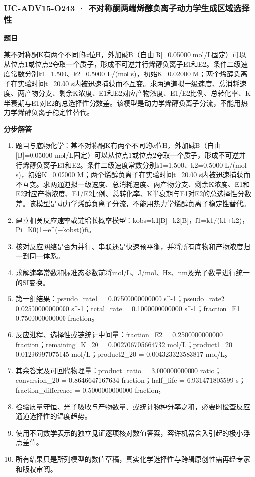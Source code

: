 \documentclass[UTF8,11pt,a4paper]{ctexart}
\begin{document}
\subsubsection*{UC-ADV15-O243 · 不对称酮两端烯醇负离子动力学生成区域选择性}
\noindent\textbf{题目}\par
某不对称酮K有两个不同的α位H，外加碱B（自由[B]=0.05000 mol/L固定）可以从位点1或位点2夺取一个质子，形成不可逆并行烯醇负离子E1和E2。条件二级速度常数分别k1=1.500、k2=0.5000 L/(mol s)，初始K=0.02000 M；两个烯醇负离子在实验时间t=20.00 s内被迅速捕获而不互变。求两通道拟一级速度、总消耗速度、两产物分支、剩余K浓度、E1和E2对应产物浓度、E1/E2比例、总转化率、K半衰期与E1对E2的总选择性分数差。该模型是动力学烯醇负离子分流，不能用热力学烯醇负离子稳定性替代。\par
\medskip\noindent\textbf{分步解答}
\begin{enumerate}
\item 题目与底物化学：某不对称酮K有两个不同的α位H，外加碱B（自由[B]=0.05000 mol/L固定）可以从位点1或位点2夺取一个质子，形成不可逆并行烯醇负离子E1和E2。条件二级速度常数分别k1=1.500、k2=0.5000 L/(mol s)，初始K=0.02000 M；两个烯醇负离子在实验时间t=20.00 s内被迅速捕获而不互变。求两通道拟一级速度、总消耗速度、两产物分支、剩余K浓度、E1和E2对应产物浓度、E1/E2比例、总转化率、K半衰期与E1对E2的总选择性分数差。该模型是动力学烯醇负离子分流，不能用热力学烯醇负离子稳定性替代。
\item 建立相关反应速率或链增长概率模型：kobs=k1[B]+k2[B]，f1=k1/(k1+k2)，Pi=K0(1−e\textasciicircum{}(−kobst))fi。
\item 核对反应网络是否为并行、串联还是快速预平衡，并将所有底物和产物浓度归一到同一体系。
\item 求解速率常数和标准态参数前将mol/L、J/mol、Hz、nm及光子数量进行统一的SI变换。
\item 第一组结果：pseudo\_rate1 = 0.07500000000000 s\textasciicircum{}-1；pseudo\_rate2 = 0.02500000000000 s\textasciicircum{}-1；total\_rate = 0.1000000000000 s\textasciicircum{}-1；fraction\_E1 = 0.7500000000000 fraction。
\item 反应进程、选择性或链统计中间量：fraction\_E2 = 0.2500000000000 fraction；remaining\_K\_20 = 0.002706705664732 mol/L；product1\_20 = 0.01296997075145 mol/L；product2\_20 = 0.004323323583817 mol/L。
\item 其余答案及可回代物理量：product\_ratio = 3.000000000000 ratio；conversion\_20 = 0.8646647167634 fraction；half\_life = 6.931471805599 s；fraction\_difference = 0.5000000000000 fraction。
\item 检验质量守恒、光子吸收与产物数量、或统计物种分率之和，必要时检查反应通道选择性的温度趋势。
\item 使用不同数学表示的独立见证逐项核对数值答案，容许机器舍入引起的极小浮点差值。
\item 所有结果只是所列模型的数值草稿，真实化学选择性与跨辑原创性需再经专家和版权审阅。
\end{enumerate}
\end{document}

